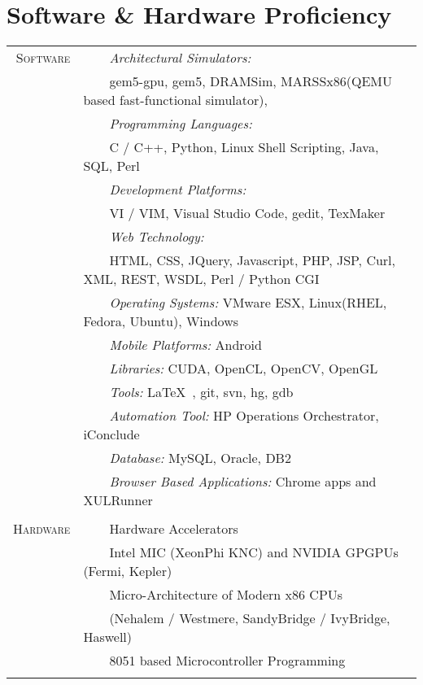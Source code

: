 \documentclass[a4paper,10pt]{article} %
\newcommand{\tabitem}{~~\llap{\textbullet}~~}
\begin{document}
\section{Software \& Hardware Proficiency}
\begin{tabular}{rl}
	\textsc{Software} & \tabitem \textit{Architectural Simulators:}\\
	& ~~~~gem5-gpu, gem5, DRAMSim, MARSSx86(QEMU based fast-functional simulator),\\
	& \tabitem \textit{Programming Languages:}\\
	& ~~~~C / C++, Python, Linux Shell Scripting, Java, SQL, Perl\\
	& \tabitem \textit{Development Platforms:} \\
	& ~~~~VI / VIM, Visual Studio Code, gedit, TexMaker\\
	& \tabitem \textit{Web Technology:} \\
	& ~~~~HTML, CSS, JQuery, Javascript, PHP, JSP, Curl, XML, REST, WSDL, Perl / Python CGI\\
	& \tabitem \textit{Operating Systems:} VMware ESX, Linux(RHEL, Fedora, Ubuntu), Windows \\
	& \tabitem \textit{Mobile Platforms:} Android \\
	& \tabitem \textit{Libraries:} CUDA, OpenCL, OpenCV, OpenGL  \\
	& \tabitem \textit{Tools:} \LaTeX\ , git, svn, hg, gdb\\
	& \tabitem \textit{Automation Tool:} HP Operations Orchestrator, iConclude \\
	& \tabitem \textit{Database:} MySQL, Oracle, DB2 \\
	& \tabitem \textit{Browser Based Applications:} Chrome apps and XULRunner \\

	&\\

	\textsc{Hardware}  & \tabitem Hardware Accelerators \\
	& ~~~~Intel MIC (XeonPhi KNC) and NVIDIA GPGPUs (Fermi, Kepler) \\
	& \tabitem Micro-Architecture of Modern x86 CPUs\\
	& ~~~~(Nehalem / Westmere, SandyBridge / IvyBridge, Haswell) \\
	& \tabitem 8051 based Microcontroller Programming \\
	&\\
\end{tabular}
\fi

\end{document}
